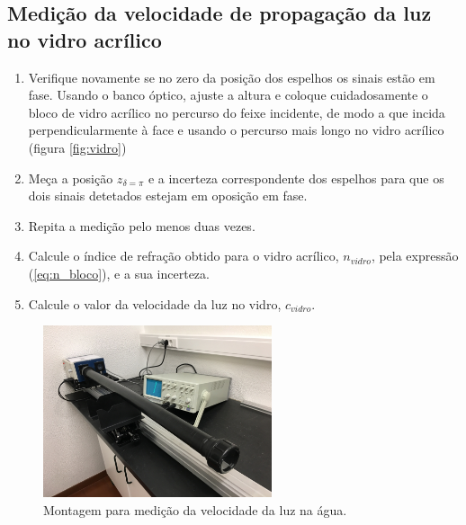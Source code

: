 \documentclass[a4paper,twoside,11pt]{report}      %
\begin{document}
\subsection{\sf Medição da velocidade de propagação da luz no vidro acrílico}
\begin{enumerate}
\item Verifique novamente se no zero da posição dos espelhos os sinais estão em fase. Usando o banco óptico, ajuste a altura e coloque cuidadosamente o bloco de vidro acrílico no percurso do feixe incidente, de modo a que incida perpendicularmente à face e usando o percurso mais longo no vidro acrílico (figura \ref{fig:vidro})
\item Meça a posição $z_{\delta=\pi}$ e a incerteza correspondente dos espelhos para que os dois sinais detetados estejam em oposição em fase. 
\item Repita a medição pelo menos duas vezes.
\item Calcule o índice de refração obtido para o vidro acrílico, $n_{vidro}$, pela expressão (\ref{eq:n_bloco}),  e a sua incerteza. 
\item Calcule o valor da velocidade da luz no vidro, $c_{vidro}$.

\end{enumerate}

 \begin{figure}[h!tb]  
	\centering 
	\includegraphics[width=0.6\textwidth]{fig8}
	\caption{Montagem para medição da velocidade da luz na água. \label{fig:agua}} 
\end{figure}
\end{document}
